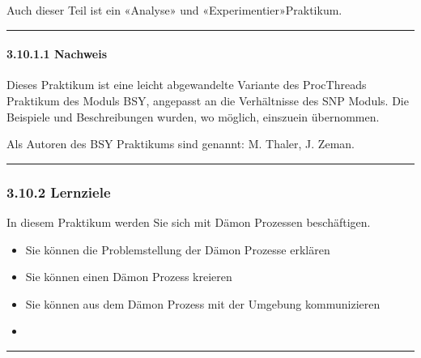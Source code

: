 \documentclass[a4paper,10pt,english]{report}
\begin{document}
\sphinxAtStartPar
Auch dieser Teil ist ein «Analyse»\sphinxhyphen{} und «Experimentier»\sphinxhyphen{}Praktikum.


\bigskip\hrule\bigskip



\paragraph{3.10.1.1 Nachweis}
\label{\detokenize{P07_Prozesse_und_Threads/README:id2}}
\sphinxAtStartPar
Dieses Praktikum ist eine leicht abgewandelte Variante des ProcThreads Praktikum des Moduls BSY, angepasst an die Verhältnisse des SNP Moduls. Die Beispiele und Beschreibungen wurden, wo möglich, eins\sphinxhyphen{}zu\sphinxhyphen{}ein übernommen.

\sphinxAtStartPar
Als Autoren des BSY Praktikums sind genannt: M. Thaler, J. Zeman.


\bigskip\hrule\bigskip



\subsubsection{3.10.2 Lernziele}
\label{\detokenize{P07_Prozesse_und_Threads/README:id3}}
\sphinxAtStartPar
In diesem Praktikum werden Sie sich mit Dämon Prozessen beschäftigen.
\begin{itemize}
\item {} 
\sphinxAtStartPar
Sie können die Problemstellung der Dämon Prozesse erklären

\item {} 
\sphinxAtStartPar
Sie können einen Dämon Prozess kreieren

\item {} 
\sphinxAtStartPar
Sie können aus dem Dämon Prozess mit der Umgebung kommunizieren

\item {} 
\end{itemize}


\bigskip\hrule\bigskip
\end{document}
